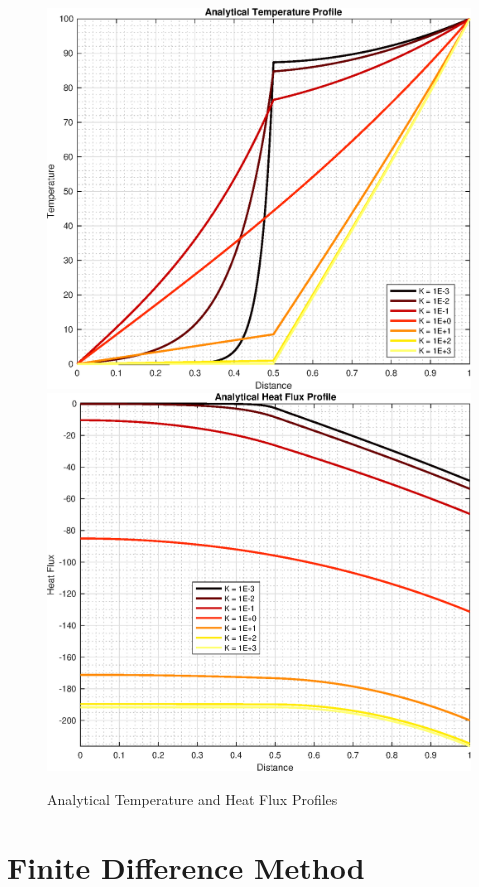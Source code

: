 \documentclass[10pt]{article}
\begin{document}
\begin{figure}[H]
	\begin{center}
		\includegraphics[width=0.497\linewidth]{aero_430_hw1_analytical_temperature}
		\includegraphics[width=0.497\linewidth]{aero_430_hw1_analytical_heat_flux}
		\caption{Analytical Temperature and Heat Flux Profiles}
	\end{center}
\end{figure}

\newpage

\section*{Finite Difference Method}
\end{document}
